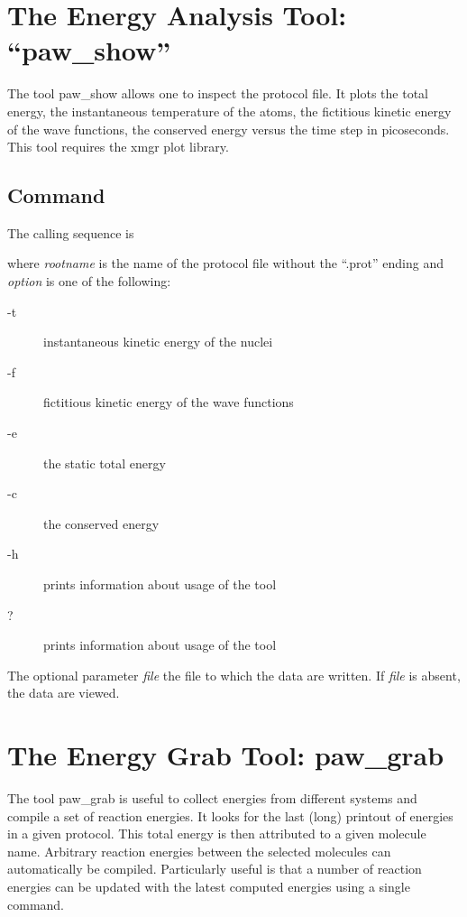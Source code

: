 \documentclass[final,12pt]{article}
\begin{document}
{%
\newpage
\section{The Energy Analysis Tool: ``paw\_show''}
The tool paw\_show allows one to inspect the protocol file. It plots the
total energy, the instantaneous temperature of the atoms, the
fictitious kinetic energy of the wave functions, the conserved energy
versus the time step in picoseconds. This tool requires the xmgr plot
library.

\subsection{Command}

The calling sequence is

\bigskip{}\bigskip

\noindent where {\it rootname} is the name of the protocol file 
without the ``.prot'' ending and {\it option} is one of the following:
\begin{description}
\item[-t] instantaneous kinetic energy of the nuclei
\item[-f] fictitious kinetic energy of the wave functions
\item[-e] the static total energy
\item[-c] the conserved energy
\item[-h] prints information about usage of the tool 
\item[?] prints information about usage of the tool 
\end{description}
The optional parameter {\it file} the file to which the data are
written. If {\it file} is absent, the data are viewed.


\newpage
\section{The Energy Grab Tool: paw\_grab}
The tool paw\_grab is useful to collect energies from different
systems and compile a set of reaction energies. It looks for the last
(long) printout of energies in a given protocol. This total energy is
then attributed to a given molecule name. Arbitrary reaction energies
between the selected molecules can automatically be
compiled. Particularly useful is that a number of reaction energies can be
updated with the latest computed energies using a single command.


}
\end{document}
